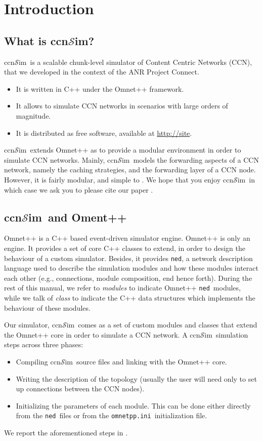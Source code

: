 \documentclass{article}
\newcommand{\ccnsim}{ccn$\mathcal{S}$im}
\newcommand{\ned}{\texttt{ned}}
\newcommand{\ini}{\texttt{omnetpp.ini}}
\begin{document}
\tableofcontents
\newpage
\section{Introduction}
\subsection{What is \ccnsim?}
\ccnsim\ is a scalable chunk-level simulator of Content Centric Networks (CCN)\cite{jacobson09conext}, that we developed in the context of the ANR Project Connect.  

\begin{itemize}
    \item It is written in C++ under the Omnet++ framework.
    \item It allows to simulate CCN networks in scenarios with large orders of magnitude.
    \item It is distributed as free software, available at \url{http://site}.
\end{itemize}
\ccnsim\ extends Omnet++ as to provide a modular environment in order to simulate CCN networks. Mainly,  \ccnsim\ models the forwarding aspects of a CCN network, namely the caching strategies, and the forwarding layer of a CCN node. However, it is fairly modular, and simple to . We hope that you enjoy \ccnsim\, in which case we ask you to please cite our paper \cite{ccn12icc}. 
\subsection{\ccnsim\ and Oment++}
Omnet++ is a C++ based event-driven simulator engine. Omnet++ is only an engine. It provides a set of core C++ classes to extend, in order to design the behaviour of a custom simulator.  Besides, it provides \ned,  a network description language   used  to describe the simulation modules and how these modules interact each other (e.g., connections, module composition, end hence forth). During the rest of this manual, we refer to \emph{modules} to indicate Omnet++ \ned\ modules, while we talk of  \emph{class} to indicate the C++ data structures which implements the behaviour of these modules. 

Our simulator, \ccnsim\ comes as a set of custom modules and classes that extend the Omnet++ core in order to simulate a CCN network. A \ccnsim\ simulation steps across three phases:  
\begin{itemize}
    \item Compiling  \ccnsim\ source files and linking with the Omnet++ core.
    \item Writing  the description of the topology (usually the user will need only to set up connections between the CCN nodes).
    \item Initializing the  parameters of each module. This can be done either directly from the \ned\ files or from the \ini\ initialization file. 
\end{itemize}
We report the aforementioned steps in .
\end{document}
